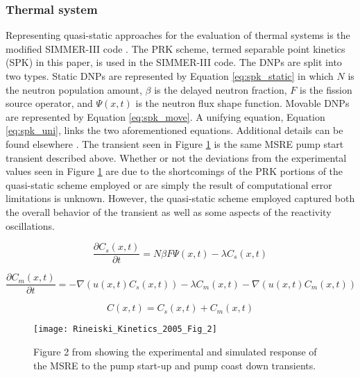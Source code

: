 \documentclass[review]{elsarticle}
\begin{document}
\subsubsection{Thermal system} \label{sssec:qs_therm}
Representing quasi-static approaches for the evaluation of thermal systems
is the modified SIMMER-III code \cite{rineiski_kinetics_2005}.
The PRK scheme, termed separable point kinetics (SPK) in this
paper, is used in the SIMMER-III code. The DNPs are split into two types.
Static DNPs are represented by Equation \ref{eq:spk_static} in which $N$ is the
neutron
population amount, $\beta$ is the delayed neutron fraction, $F$ is the fission
source operator, and $\Psi(x,t)$ is the neutron flux shape function.
Movable DNPs are represented by
Equation \ref{eq:spk_move}. A unifying equation, Equation \ref{eq:spk_uni},
links the two aforementioned equations.
Additional details can be found elsewhere \cite{rineiski_kinetics_2005}. The transient
seen in Figure \ref{fig:rineiski_msre_ps} is the same MSRE pump start transient
described above. Whether or not the deviations from the
experimental values seen in Figure \ref{fig:rineiski_msre_ps} are due to the
shortcomings of the PRK portions of the quasi-static scheme employed or are
simply the result of computational error limitations is unknown. 
However, the quasi-static scheme employed captured
both the overall behavior of the transient as well as some aspects of the
reactivity oscillations.

\begin{equation}
    \label{eq:spk_static}
    \frac{\partial C_{s}(x,t)}{\partial t} = N \beta F \Psi(x,t) -
        \lambda C_{s}(x,t)
\end{equation}
 
\begin{equation}
    \label{eq:spk_move}
    \frac{\partial C_{m}(x,t)}{\partial t} = - \nabla (u(x,t) C_{s}(x,t)) -
        \lambda C_{m}(x,t) - \nabla(u(x,t) C_{m}(x,t))
\end{equation}

\begin{equation}
    \label{eq:spk_uni}
    C(x,t) = C_{s}(x,t) + C_{m}(x,t)
\end{equation}

\begin{figure}[H]
   \centering
   \texttt{[image: Rineiski\_Kinetics\_2005\_Fig\_2]}
   \caption{Figure 2 from \cite{rineiski_kinetics_2005} showing the experimental and simulated
   response of the MSRE to the pump start-up and pump coast down transients.} 
   \label{fig:rineiski_msre_ps}
\end{figure}
\end{document}
